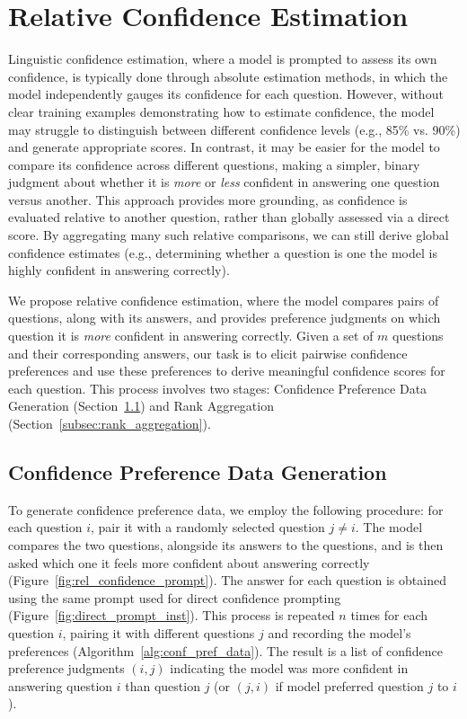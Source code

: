 \section{Relative Confidence Estimation}
Linguistic confidence estimation, where a model is prompted to assess its own confidence, is typically done through absolute estimation methods, in which the model independently gauges its confidence for each question. However, without clear training examples demonstrating how to estimate confidence, the model may struggle to distinguish between different confidence levels (e.g., 85\% vs. 90\%) and generate appropriate scores. In contrast, it may be easier for the model to compare its confidence across different questions, making a simpler, binary judgment about whether it is \textit{more} or \textit{less} confident in answering one question versus another. This approach provides more grounding, as confidence is evaluated relative to another question, rather than globally assessed via a direct score. By aggregating many such relative comparisons, we can still derive global confidence estimates (e.g., determining whether a question is one the model is highly confident in answering correctly).

We propose relative confidence estimation, where the model compares pairs of questions, along with its answers, and provides preference judgments on which question it is \textit{more} confident in answering correctly. Given a set of $m$ questions and their corresponding answers, our task is to elicit pairwise confidence preferences and use these preferences to derive meaningful confidence scores for each question. This process involves two stages: Confidence Preference Data Generation (Section~\ref{subsec:conf_pref_data_gen}) and Rank Aggregation (Section~\ref{subsec:rank_aggregation}).


\subsection{Confidence Preference Data Generation}
\label{subsec:conf_pref_data_gen}
To generate confidence preference data, we employ the following procedure: for each question $i$, pair it with a randomly selected question $j\neq i$. The model compares the two questions, alongside its answers to the questions, and is then asked which one it feels more confident about answering correctly (Figure~\ref{fig:rel_confidence_prompt}). The answer for each question is obtained using the same prompt used for direct confidence prompting (Figure~\ref{fig:direct_prompt_inst}).
This process is repeated $n$ times for each question $i$, pairing it with different questions $j$ and recording the model's preferences (Algorithm~\ref{alg:conf_pref_data}).
The result is a list of confidence preference judgments $(i, j)$ indicating the model was more confident in answering question $i$ than question $j$ (or $(j, i)$ if model preferred question $j$ to $i$). 

